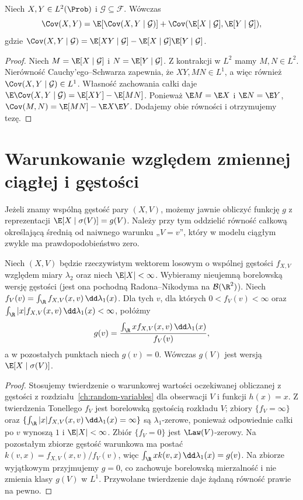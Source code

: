 \begin{twierdzenie}
Niech $X,Y\in L^2(\Prob)$ i
$\mathcal G\subseteq\mathcal F$. Wówczas
\[
\Cov(X,Y)=\E[\Cov(X,Y\mid\mathcal G)]
+\Cov(\E[X\mid\mathcal G],\E[Y\mid\mathcal G]),
\]
gdzie
$\Cov(X,Y\mid\mathcal G)=
\E[XY\mid\mathcal G]-
\E[X\mid\mathcal G]\E[Y\mid\mathcal G]$.
\end{twierdzenie}
\begin{proof}
Niech $M=\E[X\mid\mathcal G]$ i
$N=\E[Y\mid\mathcal G]$. Z kontrakcji w $L^2$
mamy $M,N\in L^2$. Nierówność Cauchy'ego--Schwarza
zapewnia, że $XY,MN\in L^1$, a więc również
$\Cov(X,Y\mid\mathcal G)\in L^1$.
Własność zachowania całki daje
$\E\Cov(X,Y\mid\mathcal G)=\E[XY]-\E[MN]$.
Ponieważ $\E M=\E X$ i $\E N=\E Y$,
$\Cov(M,N)=\E[MN]-\E X\E Y$.
Dodajemy obie równości i otrzymujemy tezę.
\end{proof}

\section{Warunkowanie względem zmiennej ciągłej i gęstości}

Jeżeli znamy wspólną gęstość pary $(X,V)$,
możemy jawnie obliczyć funkcję $g$ z reprezentacji
$\E[X\mid\sigma(V)]=g(V)$. Należy przy tym
oddzielić równość całkową określającą średnią
od naiwnego warunku „$V=v$”, który w modelu
ciągłym zwykle ma prawdopodobieństwo zero.

\begin{twierdzenie}
Niech $(X,V)$ będzie rzeczywistym wektorem losowym
o wspólnej gęstości $f_{X,V}$ względem miary
$\lambda_2$ oraz niech $\E|X|<\infty$.
Wybieramy nieujemną borelowską wersję gęstości
(jest ona pochodną Radona--Nikodyma na $\mathcal B(\R^2)$).
Niech $f_V(v)=\int_\R f_{X,V}(x,v)\,\dd\lambda_1(x)$.
Dla tych $v$, dla których $0<f_V(v)<\infty$ oraz
$\int_\R |x|f_{X,V}(x,v)\,\dd\lambda_1(x)<\infty$,
połóżmy
\[
g(v)=\frac{\int_\R x f_{X,V}(x,v)\,\dd\lambda_1(x)}{f_V(v)},
\]
a w pozostałych punktach niech $g(v)=0$.
Wówczas $g(V)$ jest wersją
$\E[X\mid\sigma(V)]$.
\end{twierdzenie}
\begin{proof}
Stosujemy twierdzenie o warunkowej wartości
oczekiwanej obliczanej z gęstości z
rozdziału~\ref{ch:random-variables} dla obserwacji
$V$ i funkcji $h(x)=x$. Z twierdzenia Tonellego
$f_V$ jest borelowską gęstością rozkładu $V$;
zbiory $\{f_V=\infty\}$ oraz
$\{\int_\R |x|f_{X,V}(x,v)\,\dd\lambda_1(x)=\infty\}$
są $\lambda_1$-zerowe, ponieważ odpowiednie całki
po $v$ wynoszą $1$ i $\E|X|<\infty$.
Zbiór $\{f_V=0\}$ jest $\Law(V)$-zerowy.
Na pozostałym zbiorze gęstość warunkowa ma postać
$k(v,x)=f_{X,V}(x,v)/f_V(v)$, więc
$\int_\R xk(v,x)\,\dd\lambda_1(x)=g(v)$.
Na zbiorze wyjątkowym przyjmujemy $g=0$,
co zachowuje borelowską mierzalność i nie zmienia
klasy $g(V)$ w $L^1$. Przywołane twierdzenie daje
żądaną równość prawie na pewno.
\end{proof}

